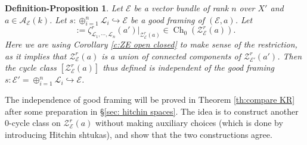 \documentclass[reqno]{amsart}
\numberwithin{equation}{section}
\newcommand{\Cal}[1]{\mathcal{#1}}
\newcommand{\inj}{\hookrightarrow}
\DeclareMathOperator{\coker}{coker}
\DeclareMathOperator{\Ima}{Im\,}
\DeclareMathOperator{\Ch}{Ch}
\DeclareMathOperator{\Lagr}{Lagr}
\newcommand{\TF}[1]{{\color{gray} {#1}}}
\newcommand{\ov}{\overline}
\newcommand\op{\oplus}
\newcommand{\s}{\sigma}
\newcommand{\z}{\zeta}
\newcommand\cA{\mathcal{A}}
\newcommand\cE{\mathcal{E}}
\newcommand\cF{\mathcal{F}}
\newcommand\cL{\mathcal{L}}
\newcommand\cS{\mathcal{S}}
\newcommand\cT{\mathcal{T}}
\newcommand\cZ{\mathcal{Z}}
\newtheorem{defn-prop}[thm]{Definition-Proposition}
\theoremstyle{remark}
\numberwithin{equation}{section}
\begin{document}
%



\begin{defn-prop}\label{defn:general KR} Let $\cE$ be a vector bundle of rank $n$ over $X'$ and $a\in \cA_{\cE}(k)$. Let $s:\op_{i=1}^{n}\cL_{i}\inj \cE$ be a good framing of $(\cE,a)$. Let 
\begin{equation}
[\Cal{Z}^{r}_{\Cal{E}}(a)]:=\z^r_{\cL_{1},\cdots, \cL_{n}}(a')|_{\cZ^{r}_{\cE}(a)}\in \Ch_{0}(\cZ_{\cE}^{r}(a)).
\end{equation}
Here we are using Corollary \ref{c:ZE open closed} to make sense of the restriction, as it implies that $\Cal{Z}^{r}_{\Cal{E}}(a)$ is a union of connected components of $\Cal{Z}^{r}_{\Cal{E}'}(a')$. Then the cycle class $[\Cal{Z}^{r}_{\Cal{E}}(a)]$ thus defined is independent of the good framing $s:\cE'=\op_{i=1}^{n}\cL_{i}\inj \cE$. 
\end{defn-prop}
The independence of good framing  will be proved in Theorem \ref{th:compare KR} after some preparation in \S\ref{sec: hitchin spaces}. The idea is to construct another $0$-cycle class on $\cZ^{r}_{\cE}(a)$ without making auxiliary choices (which is done by introducing Hitchin shtukas), and show that the two constructions agree. 
\end{document}
